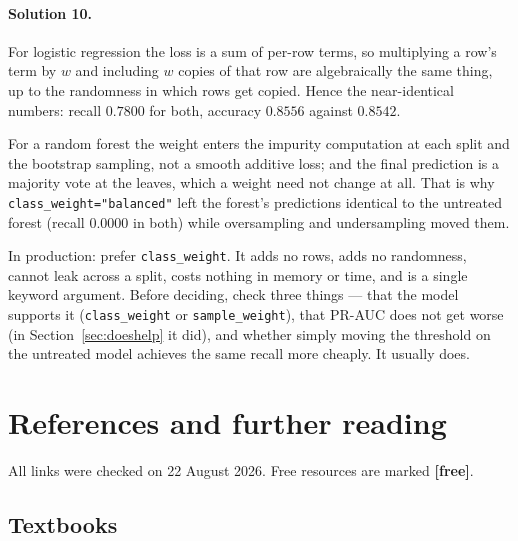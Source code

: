 \documentclass[11pt]{article}
\begin{document}
\paragraph{Solution 10.} For logistic regression the loss is a sum of per-row
terms, so multiplying a row's term by $w$ and including $w$ copies of that row
are algebraically the same thing, up to the randomness in which rows get
copied. Hence the near-identical numbers: recall $0.7800$ for both, accuracy
$0.8556$ against $0.8542$.

For a random forest the weight enters the impurity computation at each split
and the bootstrap sampling, not a smooth additive loss; and the final
prediction is a majority vote at the leaves, which a weight need not change at
all. That is why \texttt{class\_weight="balanced"} left the forest's
predictions identical to the untreated forest (recall $0.0000$ in both) while
oversampling and undersampling moved them.

In production: prefer \texttt{class\_weight}. It adds no rows, adds no
randomness, cannot leak across a split, costs nothing in memory or time, and
is a single keyword argument. Before deciding, check three things --- that the
model supports it (\texttt{class\_weight} or \texttt{sample\_weight}), that
PR-AUC does not get worse (in Section~\ref{sec:doeshelp} it did), and whether
simply moving the threshold on the untreated model achieves the same recall
more cheaply. It usually does.

\section{References and further reading}
\label{sec:refs}

All links were checked on 22 August 2026. Free resources are marked
\textbf{[free]}.

\subsection*{Textbooks}
\end{document}
